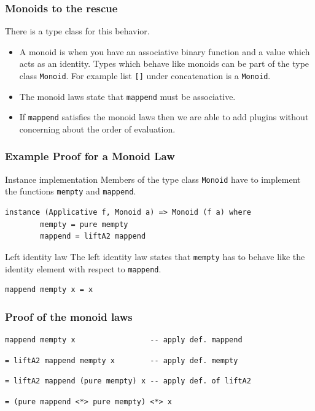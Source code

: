 \documentclass{beamer}
\begin{document}
\begin{frame}[fragile]
  \frametitle{Monoids to the rescue}

There is a type class for this behavior.

\begin{itemize}
\item A monoid is when you have an associative binary function and a value which acts as an identity. Types which behave like monoids can be part of the type class \verb|Monoid|. For example list \verb|[]| under concatenation is a \verb|Monoid|.
\item The monoid laws state that \verb|mappend| must be associative.
\item If \verb|mappend| satisfies the monoid laws then we are able to add plugins without concerning about the order of evaluation.
\end{itemize}

\end{frame}

\begin{frame}[fragile]
\frametitle{Example Proof for a Monoid Law}  
\begin{block}{Instance implementation}
Members of the type class \verb|Monoid| have to implement the functions \verb|mempty| and \verb|mappend|.
  \begin{Verbatim}[fontsize=\footnotesize]
    instance (Applicative f, Monoid a) => Monoid (f a) where
        mempty = pure mempty
        mappend = liftA2 mappend
  \end{Verbatim}
\end{block}
\begin{block}{Left identity law}
The left identity law states that \verb|mempty| has to behave like the identity element with respect to \verb|mappend|.
\begin{Verbatim}[fontsize=\footnotesize]
mappend mempty x = x
\end{Verbatim}  
\end{block}

\end{frame}

\begin{frame}[fragile]
  \frametitle{Proof of the monoid laws}
 \let\thefootnote\relax{}
\begin{verbatim}
mappend mempty x                 -- apply def. mappend
\end{verbatim}
\pause
\begin{verbatim}
= liftA2 mappend mempty x        -- apply def. mempty
\end{verbatim}
\pause
\begin{verbatim}
= liftA2 mappend (pure mempty) x -- apply def. of liftA2
\end{verbatim}
\pause
\begin{verbatim}
= (pure mappend <*> pure mempty) <*> x   
\end{verbatim}

\end{frame}
\end{document}
